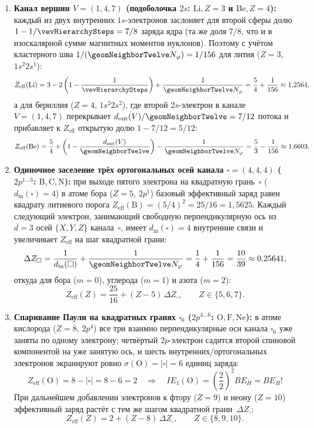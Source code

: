 \begin{enumerate}[leftmargin=*]
\item \textbf{Канал вершин $V=(1,4,7)$ (подоболочка $2s$: $\text{Li}, Z=3$ и $\text{Be}, Z=4$):}
  каждый из двух внутренних $1s$-электронов заслоняет для второй сферы долю $1-1/\vevHierarchySteps=7/8$ заряда ядра
  (та же доля $7/8$, что и в изоскалярной сумме магнитных моментов нуклонов).
  Поэтому с учётом кластерного шва $1/(\geomNeighborTwelve N_\varphi)=1/156$ для лития ($Z=3$, $1s^2 2s^1$):
  \[
    Z_{\mathrm{eff}}(\text{Li})
    = 3 - 2\left(1 - \frac{1}{\vevHierarchySteps}\right) + \frac{1}{\geomNeighborTwelve N_\varphi}
    = \frac{5}{4} + \frac{1}{156} \approx 1{,}2564,
  \]
  а для бериллия ($Z=4$, $1s^2 2s^2$), где второй $2s$-электрон в канале $V=(1,4,7)$ перекрывает $d_{\mathrm{out}}(V)/\geomNeighborTwelve=7/12$ потока и прибавляет к $Z_{\mathrm{eff}}$ открытую долю $1-7/12=5/12$:
  \[
    Z_{\mathrm{eff}}(\text{Be})
    = \frac{5}{4} + \left(1 - \frac{d_{\mathrm{out}}(V)}{\geomNeighborTwelve}\right) - \frac{1}{\geomNeighborTwelve N_\varphi}
    = \frac{5}{3} - \frac{1}{156} \approx 1{,}6603.
  \]
\item \textbf{Одиночное заселение трёх ортогональных осей канала $\square=(4,4,4)$ ($2p^{1\ldots 3}$: $\text{B}, \text{C}, \text{N}$):}
  при выходе пятого электрона на квадратную грань~$\square$ ($d_{\mathrm{in}}(\square)=4$) в атоме бора ($Z=5$, $2p^1$)
  базовый эффективный заряд равен квадрату литиевого порога $Z_{\mathrm{eff}}(\text{B})=(5/4)^2=25/16=1{,}5625$.
  Каждый следующий электрон, занимающий свободную перпендикулярную ось из $d=3$ осей $\{X,Y,Z\}$ канала~$\square$,
  имеет $d_{\mathrm{in}}(\square)=4$ внутренние связи и увеличивает $Z_{\mathrm{eff}}$ на шаг квадратной грани:
  \[
    \Delta Z_\square
    = \frac{1}{d_{\mathrm{in}}(\square)} + \frac{1}{\geomNeighborTwelve N_\varphi}
    = \frac{1}{4} + \frac{1}{156}
    = \frac{10}{39} \approx 0{,}25641,
  \]
  откуда для бора ($m=0$), углерода ($m=1$) и азота ($m=2$):
  \[
    Z_{\mathrm{eff}}(Z) = \frac{25}{16} + (Z-5)\,\Delta Z_\square,\qquad Z\in\{5,6,7\}.
  \]
\item \textbf{Спаривание Паули на квадратных гранях $\square_6$ ($2p^{4\ldots 6}$: $\text{O}, \text{F}, \text{Ne}$):}
  в атоме кислорода ($Z=8$, $2p^4$) все три взаимно перпендикулярные оси канала $\square_6$ уже заняты по одному электрону;
  четвёртый $2p$-электрон садится второй спиновой компонентой на уже занятую ось,
  и шесть внутренних/ортогональных электронов экранируют ровно $\sigma(\text{O})=|\square|=6$ единиц заряда:
  \[
    Z_{\mathrm{eff}}(\text{O}) = 8 - |\square| = 8 - 6 = 2
    \quad\Longrightarrow\quad
    IE_1(\text{O}) = \left(\frac{2}{2}\right)^{\!2} BE_H = BE_H!
  \]
  При дальнейшем добавлении электронов к фтору ($Z=9$) и неону ($Z=10$) эффективный заряд растёт с тем же шагом квадратной грани~$\Delta Z_\square$:
  \[
    Z_{\mathrm{eff}}(Z) = 2 + (Z-8)\,\Delta Z_\square,\qquad Z\in\{8,9,10\}.
  \]
\end{enumerate}

